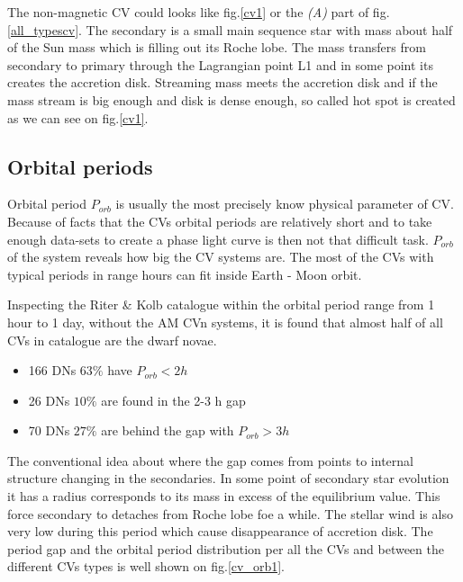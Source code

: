 \documentclass[oneside,a4paper,11pt]{report}
\begin{document}
The non-magnetic CV could looks like fig.\ref{cv1} or the \textit{(A)} part of fig.\ref{all_typescv}. The secondary is a small main sequence star with mass about 
half of the Sun mass which is filling out its Roche lobe. The mass transfers from secondary to primary
through the Lagrangian point L1 and in some point its creates the accretion disk. Streaming mass meets the accretion disk and if the mass stream is big enough and disk is dense enough, so called 
hot spot is created as we can see on fig.\ref{cv1}.  

\subsection{Orbital periods}
Orbital period $P_{orb}$ is usually the most precisely know physical parameter of CV. Because of facts that the 
CVs orbital periods are relatively short and to take enough data-sets to create a phase light curve 
is then not that difficult task. $P_{orb}$ of the system reveals how big the CV systems are. The most of the 
CVs with typical periods in range hours can fit inside Earth - Moon orbit. 

Inspecting the Riter \& Kolb catalogue \citet{2003A&A...404..301R} within the orbital period range from 1 hour to 1 day, without the AM CVn systems, 
it is found that almost half of all CVs in catalogue are the dwarf novae.
\begin{itemize}
 \item 166 DNs $63\%$ have $P_{orb} < 2h$
 \item 26 DNs $10\%$ are found in the 2-3 h gap 
 \item 70 DNs $27\%$ are behind the gap with $P_{orb} > 3h$  
\end{itemize}
The conventional idea about where the gap comes from points to internal structure changing in the secondaries.   
In some point of secondary star evolution it has a radius corresponds to its mass in excess of the equilibrium value. 
This force secondary to detaches  from Roche lobe foe a while. The stellar wind is also very low during this period which cause disappearance of accretion disk.
The period gap and the orbital period distribution per all the CVs and between the different CVs types is well shown on fig.\ref{cv_orb1}.  
\end{document}
